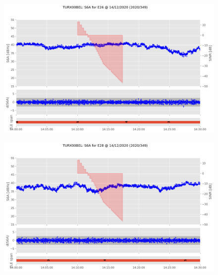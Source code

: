 \begin{enumerate}
%


\begin{figure}[H]%
\centering%
\includegraphics[width=0.95\linewidth]{png/TURX00BEL_R_20203491400_30M_01S_MO_E-S6A-E26.png}%
\end{figure}

%


\begin{figure}[H]%
\centering%
\includegraphics[width=0.95\linewidth]{png/TURX00BEL_R_20203491400_30M_01S_MO_E-S6A-E28.png}%
\end{figure}

%
\end{enumerate}

%
\newpage%
